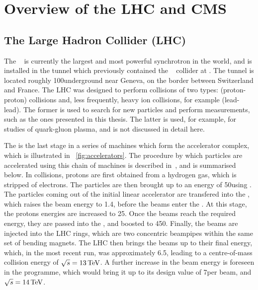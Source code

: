 \chapter{Overview of the LHC and CMS}
\label{chap:detector}
\section{The Large Hadron Collider (LHC)}
\label{sec:lhc}
The \LHC~\cite{LHC_machine} is currently the largest and most powerful synchrotron in the world, and is installed in the tunnel which previously contained the \LEP~\cite{lepdesign} collider at \CERN. 
The tunnel is located roughly 100\m underground near Geneva, on the border between Switzerland and France. The LHC was designed to perform collisions of two types: \pp (proton-proton) collisions and, less frequently, heavy ion collisions, for example \PbPb (lead-lead). The former is used to search for new particles and perform \SM measurements, such as the ones presented in this thesis. The latter is used, for example, for studies of quark-gluon plasma, and is not discussed in detail here. 

The \LHC is the last stage in a series of machines which form the \CERN accelerator complex, which is illustrated in \Fig~\ref{fig:accelerators}. The procedure by which particles are accelerated using this chain of machines is described in~\cite{LHC_machine}, and is summarised below. In \pp collisions, protons are first obtained from a hydrogen gas, which is stripped of electrons. The particles are then brought up to an energy of 50\MeV using \LINACTWO. The particles coming out of the initial linear accelerator are transfered into the \Booster, which raises the beam energy to 1.4\GeV, before the beams enter the \PS. At this stage, the protons energies are increased to 25\GeV. Once the beams reach the required energy, they are passed into the \SPS, and boosted to 450\GeV. Finally, the beams are injected into the LHC rings, which are two concentric beampipes within the same set of bending magnets. The LHC then brings the beams up to their final energy, which, in the most recent run, was approximately 6.5\TeV, leading to a centre-of-mass collision energy of $\sqrt{s}=13\,\text{Te\hspace{-.08em}V}$. A further increase in the beam energy is foreseen in the \LHC programme, which would bring it up to its design value of 7\TeV per beam, and $\sqrt{s}=14\,\text{Te\hspace{-.08em}V}$.

